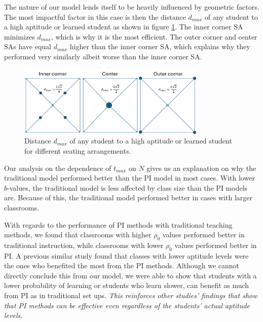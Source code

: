 The nature of our model lends itself to be heavily influenced by geometric factors. 
The most impactful factor in this case is then the distance $d_{max}$ of any student to a high aptitude or learned student as shown in figure \ref{fig:SA dmax}. 
The inner corner SA minimizes $d_{max}$, which is why it is the most efficient. 
The outer corner and center SAs have equal $d_{max}$ higher than the inner corner SA, which explains why they performed very similarly albeit worse than the inner corner SA.

\begin{figure}[htbp!]
    \centering
    \includegraphics[width=0.8\textwidth]{figures/SA dmax.png}
    \caption{Distance $d_{max}$ of any student to a high aptitude or learned student for different seating arrangements.}
    \label{fig:SA dmax}
\end{figure}

Our analysis on the dependence of $t_{max}$ on $N$ gives us an explanation on why the traditional model performed better than the PI model in most cases. 
With lower $b$-values, the traditional model is less affected by class size than the PI models are. 
Because of this, the traditional model performed better in cases with larger classrooms. 

With regards to the performance of PI methods with traditional teaching methods, we found that classrooms with higher $\rho_0$ values performed better in traditional instruction, while classrooms with lower $\rho_0$ values performed better in PI. 
A previous similar study \cite{roxas2010seating} found that classes with lower aptitude levels were the ones who benefited the most from the PI methods.
Although we cannot directly conclude this from our model, we were able to show that students with a lower probability of learning or students who learn slower, can benefit as much from PI as in traditional set ups. 
\textit{This reinforces other studies' findings \cite{lasry2008peer} that show that PI methods can be effective even regardless of the students' actual aptitude levels.}

    
